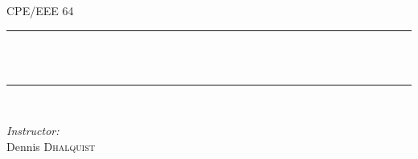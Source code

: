 \begin{titlepage}
	\begin{center}
		\vspace{1 cm}
		
		\textsc{\Huge CPE/EEE 64}\\[1.3cm]

		\vspace{5 mm}
		
		\rule{415pt}{2pt}\\
		{ \huge \bfseries \TITLE \\[0.2cm] }
		\rule{415pt}{2pt}\\
		
		\vspace{10mm}
		
		\begin{minipage}{0.4\textwidth}
		\begin{flushleft} \large
		
		\end{flushleft}
		\end{minipage}
		
		\begin{minipage}{\textwidth}
		\begin{flushright} \large
		
		\centering
		\emph{Instructor:} \\
			Dennis 	\textsc{Dhalquist} \\
		\end{flushright}
		\end{minipage}
	\end{center}
	
	\vspace{30mm}
	
	\begin{center}
	\begin{minipage}{.85\textwidth}
		\begin{flushleft} \large
			\begin{abstract}
				\ABSTRACT \\
			\end{abstract}
		\end{flushleft}
		
		\begin{flushleft} \large
		\end{flushleft}


\end{minipage}
\end{center}
\end{titlepage}
